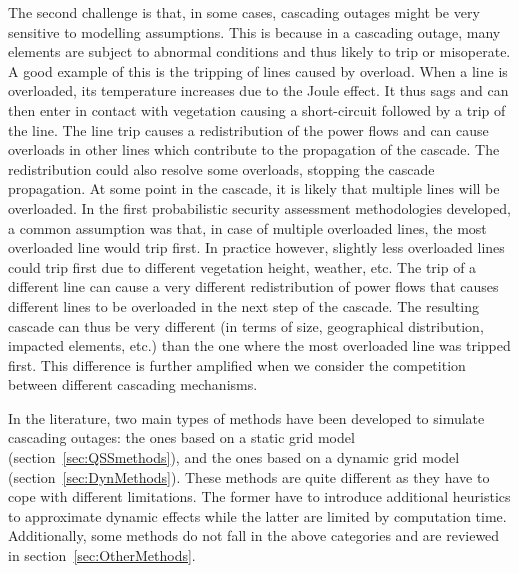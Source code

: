 The second challenge is that, in some cases, cascading outages might be very sensitive to modelling assumptions. This is because in a cascading outage, many elements are subject to abnormal conditions and thus likely to trip or misoperate. A good example of this is the tripping of lines caused by overload. When a line is overloaded, its temperature increases due to the Joule effect. It thus sags and can then enter in contact with vegetation causing a short-circuit followed by a trip of the line. The line trip causes a redistribution of the power flows and can cause overloads in other lines which contribute to the propagation of the cascade. The redistribution could also resolve some overloads, stopping the cascade propagation. At some point in the cascade, it is likely that multiple lines will be overloaded. In the first probabilistic security assessment methodologies developed, a common assumption was that, in case of multiple overloaded lines, the most overloaded line would trip first. In practice however, slightly less overloaded lines could trip first due to different vegetation height, weather, etc. The trip of a different line can cause a very different redistribution of power flows that causes different lines to be overloaded in the next step of the cascade. The resulting cascade can thus be very different (in terms of size, geographical distribution, impacted elements, etc.) than the one where the most overloaded line was tripped first. This difference is further amplified when we consider the competition between different cascading mechanisms.

In the literature, two main types of methods have been developed to simulate cascading outages: the ones based on a static grid model (section~\ref{sec:QSSmethods}), and the ones based on a dynamic grid model (section~\ref{sec:DynMethods}). These methods are quite different as they have to cope with different limitations. The former have to introduce additional heuristics to approximate dynamic effects while the latter are limited by computation time. Additionally, some methods do not fall in the above categories and are reviewed in section~\ref{sec:OtherMethods}.


